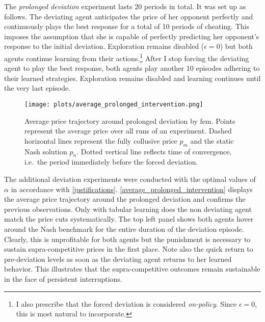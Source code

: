 The \emph{prolonged deviation} experiment lasts 20 periods in total. It was set up as follows. The deviating agent anticipates the price of her opponent perfectly and continuously plays the best response for a total of 10 periods of cheating. This imposes the assumption that she is capable of perfectly predicting her opponent's response to the initial deviation. Exploration remains disabled ($\epsilon = 0$) but both agents continue learning from their actions.\footnote{I also prescribe that the forced deviation is considered \emph{on-policy}. Since $\epsilon = 0$, this is most natural to incorporate.} After I stop forcing the deviating agent to play the best response, both agents play another 10 episodes adhering to their learned strategies. Exploration remains disabled and learning continues until the very last episode.

\begin{figure}
	\texttt{[image: plots/average\_prolonged\_intervention.png]}
	\caption[Average price trajectory around prolonged deviation by \gls{fem}]{Average price trajectory around prolonged deviation by \gls{fem}. Points represent the average price over all runs of an experiment. Dashed horizontal lines represent the fully collusive price $p_m$ and the static Nash solution $p_n$. Dotted vertical line reflects time of convergence, i.e.\ the period immediately before the forced deviation.}
	\label{average_prolonged_intervention}
\end{figure}

The additional deviation experiments were conducted with the optimal values of $\alpha$ in accordance with \autoref{justifications}. \autoref{average_prolonged_intervention} displays the average price trajectory around the prolonged deviation and confirms the previous observations. Only with tabular learning does the non deviating agent match the price cuts systematically. The top left panel shows both agents hover around the Nash benchmark for the entire duration of the deviation episode. Clearly, this is unprofitable for both agents but the punishment is necessary to sustain supra-competitive prices in the first place. Note also the quick return to pre-deviation levels as soon as the deviating agent returns to her learned behavior. This illustrates that the supra-competitive outcomes remain sustainable in the face of persistent interruptions.

